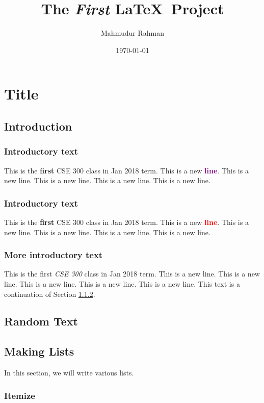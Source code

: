 \documentclass{book}
\title{The \textit{First} \LaTeX ~\textbf{Project}}
\author{Mahmudur Rahman}
\date{\today}
\begin{document}
\maketitle
\newpage

\tableofcontents
\newpage
\chapter{Title}

\section{Introduction}

\subsection{Introductory text}
This is the \textbf{first} CSE 300 class in Jan 2018 term.
This is a new \textcolor{purple}{\textbf{line}}.
This is a new line.
This is a new line.
This is a new line.
This is a new line.


\subsection{Introductory text}
\label{sec:intro_text}
This is the \textbf{first} CSE 300 class in Jan 2018 term.
This is a new \textcolor{red}{\textbf{line}}.
This is a new line.
This is a new line.
This is a new line.
This is a new line.

\subsection{More introductory text}
This is the first \textit{CSE 300} class in Jan 2018 term.
This is a new line.
This is a new line.
This is a new line.
This is a new line.
This is a new line. This text is a continuation of Section \ref{sec:intro_text}.

\section{Random Text}

\lipsum[1-2]

\section{Making Lists}
In this section, we will write various lists.

\subsection{Itemize}
\end{document}
